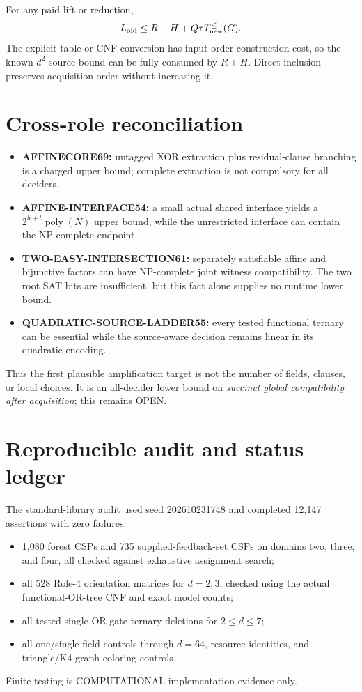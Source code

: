 \documentclass[11pt]{article}
\begin{document}
For any paid lift or reduction,
\[
L_{\rm old}\le R+H+Q\tau T_{\rm new}^{\le}(G).
\]
The explicit table or CNF conversion has input-order construction cost, so
the known $d^2$ source bound can be fully consumed by $R+H$. Direct inclusion
preserves acquisition order without increasing it.

\section{Cross-role reconciliation}
\begin{itemize}
\item \textbf{AFFINECORE69:} untagged XOR extraction plus residual-clause
branching is a charged upper bound; complete extraction is not compulsory for
all deciders.
\item \textbf{AFFINE-INTERFACE54:} a small actual shared interface yields a
$2^{h+t}\operatorname{poly}(N)$ upper bound, while the unrestricted interface
can contain the NP-complete endpoint.
\item \textbf{TWO-EASY-INTERSECTION61:} separately satisfiable affine and
bijunctive factors can have NP-complete joint witness compatibility. The two
root SAT bits are insufficient, but this fact alone supplies no runtime lower
bound.
\item \textbf{QUADRATIC-SOURCE-LADDER55:} every tested functional ternary can
be essential while the source-aware decision remains linear in its quadratic
encoding.
\end{itemize}
Thus the first plausible amplification target is not the number of fields,
clauses, or local choices. It is an all-decider lower bound on \emph{succinct
global compatibility after acquisition}; this remains OPEN.

\section{Reproducible audit and status ledger}
The standard-library audit used seed 202610231748 and completed 12,147
assertions with zero failures:
\begin{itemize}
\item 1,080 forest CSPs and 735 supplied-feedback-set CSPs on domains two,
three, and four, all checked against exhaustive assignment search;
\item all 528 Role-4 orientation matrices for $d=2,3$, checked using the
actual functional-OR-tree CNF and exact model counts;
\item all tested single OR-gate ternary deletions for $2\le d\le7$;
\item all-one/single-field controls through $d=64$, resource identities, and
triangle/K4 graph-coloring controls.
\end{itemize}
Finite testing is COMPUTATIONAL implementation evidence only.
\end{document}

